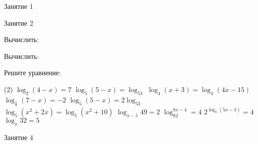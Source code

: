 %
%

\begin{class}[number=1]
	\begin{listofex}
		\item Занятие 1
	\end{listofex}
\end{class}

\begin{class}[number=2]
	\begin{listofex}
		\item Занятие 2
	\end{listofex}
\end{class}

\begin{class}[number=3]
	\begin{listofex}
		\item Вычислить:
		\begin{itasks}[2]
			\task {}
			\task {}
			\task {}
			\task {}
			\task {}
			\task {}
			\task {}
		\end{itasks}
		\item Вычислить:
		\begin{itasks}[1]
			\task {}
			\task {}
			\task {}
			\task {}
		\end{itasks}
		\item {}
		\item Решите уравнение:
		\begin{tasks}(2)
			\task \( \log_2(4-x)=7 \)
			\task \( \log_5(5-x)=\log_53 \)
			\task \( \log_4(x+3)=\log_4(4x-15) \)
			\task \( \log_{\frac{1}{7}}(7-x)=-2 \)
			\task \( \log_5(5-x)=2\log_53 \)
			\task \( \log_5(x^2+2x)=\log_5(x^2+10) \)
			\task \( \log_{x-5}49=2 \)
			\task \( \log_82^{8x-4}=4 \)
			\task \( 2^{\log_8(5x-3)}=4 \)
			\task \( \log_x32=5 \)
		\end{tasks}
	\end{listofex}
\end{class}

\begin{class}[number=4]
	\begin{listofex}
		\item Занятие 4
	\end{listofex}
\end{class}

